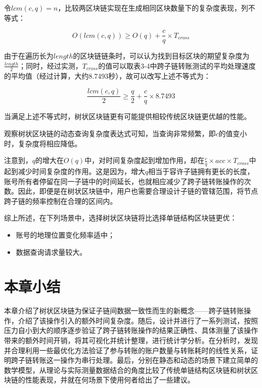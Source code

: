 令$lcm(c, q) = n$，比较两区块链实现在生成相同区块数量下的复杂度表现，列不等式：

$$
    O(lcm(c, q)) \geq O(q) + \frac{c}{q} \times T_{cross}
$$

由于在遍历长为$length$的区块链链条时，可以认为找到目标区块的期望复杂度为$\frac{length}{2}$；同时，经过实测，$T_{cross}$的值可以取表3-4中跨子链转账测试的平均处理速度的平均值（经过计算，大约8.7493秒），故可以改写上述不等式为：

$$
    \frac{lcm(c, q)}{2} \geq \frac{q}{2} + \frac{c}{q} \times 8.7493
$$

当满足上述不等式时，树状区块链更有可能提供相较传统区块链更优越的性能。

观察树状区块链的动态查询复杂度表达式可知，当查询非常频繁，即$c$的值变小时，复杂度将相应降低。

注意到，$q$的增大在$O(q)$中，对时间复杂度起到增加作用，却在$\frac{c}{q} \times acc \times T_{cross}$中起到减少时间复杂度的作用。这是因为，增大$q$相当于容许子链拥有更长的长度，账号所有者停留在同一子链中的时间延长，也就相应减少了跨子链转账操作的次数。因此，即便是在树状区块链中，用户也需要合理设计子链的管辖范围，将节点跨子链的频率控制在合理的区间内。

综上所述，在下列场景中，选择树状区块链将比选择单链结构区块链更优：

\begin{itemize}
    \item 账号的地理位置变化频率适中；
    \item 数据查询请求量较大。
\end{itemize}

\section{本章小结}

本章介绍了树状区块链为保证子链间数据一致性而生的新概念——跨子链转账操作，介绍了该操作引入的额外时间复杂度。随后，设计并进行了一系列测试，按照压力自小到大的顺序逐步验证了跨子链转账操作的结果正确性、具体测量了该操作带来的额外时间开销，将其可视化并统计整理，进行统计学分析。在分析时，发现并合理利用一些最优化方法验证了参与转账的账户数量与转账耗时的线性关系，证明跨子链转账这一操作为串行处理。最后，分别在静态和动态的场景下建立简单的数学模型，从理论与实际测量数据结合的角度比较了传统单链结构区块链和树状区块链的性能表现，并就在何场景下使用何者给出了一些建议。
